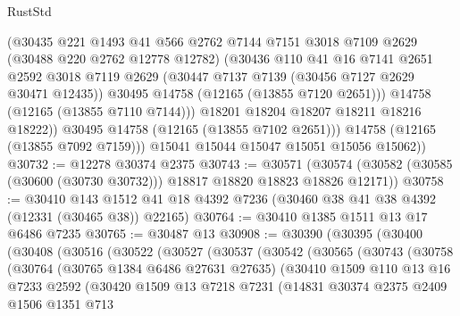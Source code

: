 \begin{lexlean}{RustStd}
\begin{coremodule}
                (@30435
                  @221
                  @1493
                  @41
                  @566
                  @2762
                  @7144
                  @7151
                  @3018
                  @7109
                  @2629
                  (@30488 @220 @2762 @12778 @12782)
                  (@30436
                    @110
                    @41
                    @16
                    @7141
                    @2651
                    @2592
                    @3018
                    @7119
                    @2629
                    (@30447 @7137 @7139 (@30456 @7127 @2629 @30471 @12435))
                    @30495
                    @14758
                    (@12165 (@13855 @7120 @2651)))
                  @14758
                  (@12165 (@13855 @7110 @7144)))
                @18201
                @18204
                @18207
                @18211
                @18216
                @18222))
            @30495
            @14758
            (@12165 (@13855 @7102 @2651)))
          @14758
          (@12165 (@13855 @7092 @7159)))
        @15041
        @15044
        @15047
        @15051
        @15056
        @15062))
@30732 := @12278 @30374 @2375
@30743 := @30571
    (@30574 (@30582 (@30585 (@30600 (@30730 @30732))) @18817 @18820 @18823 @18826 @12171))
@30758 := @30410
    @143
    @1512
    @41
    @18
    @4392
    @7236
    (@30460 @38 @41 @38 @4392 (@12331 (@30465 @38)) @22165)
@30764 := @30410 @1385 @1511 @13 @17 @6486 @7235
@30765 := @30487 @13
@30908 := @30390
    (@30395
      (@30400
        (@30408
          (@30516
            (@30522
              (@30527
                (@30537
                  (@30542
                    (@30565
                      (@30743
                        (@30758
                          (@30764
                            (@30765 @1384 @6486 @27631 @27635)
                            (@30410
                              @1509
                              @110
                              @13
                              @16
                              @7233
                              @2592
                              (@30420
                                @1509
                                @13
                                @7218
                                @7231
                                (@14831
                                  @30374
                                  @2375
                                  @2409
                                  @1506
                                  @1351
                                  @713

\end{coremodule}
\end{lexlean}
